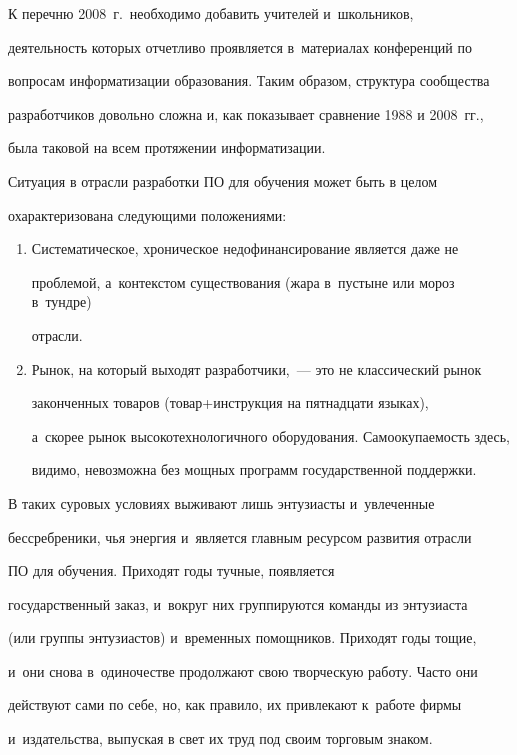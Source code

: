   К перечню 2008~г.\ необходимо добавить учителей и~школьников,

деятельность которых отчетливо проявляется в~материалах конференций по

вопросам информатизации образования. Таким образом, структура сообщества

разработчиков довольно сложна и, как показывает сравнение 1988 и 2008~гг.,

была таковой на всем протяжении информатизации.



  Ситуация в отрасли разработки ПО для обучения может быть в целом

охарактеризована следующими положениями:

  \begin{enumerate}[1.]

  \item  Систематическое, хроническое недофинансирование является даже не

проб\-ле\-мой, а~контекстом существования (жара в~пустыне или мороз в~тундре)

отрасли.

  \item  Рынок, на который выходят разработчики,~--- это не классический рынок

законченных товаров (то\-вар\;+\;ин\-струк\-ция на пятнадцати языках),

а~скорее рынок высокотехнологичного оборудования. Самоокупаемость здесь,

видимо, невозможна без мощных программ государственной поддержки.

  \end{enumerate}



  В таких суровых условиях выживают лишь энтузиасты и~увлеченные

бес\-среб\-реники, чья энергия и~является главным ресурсом развития отрасли

ПО для обучения. Приходят годы тучные, появляется

государственный заказ, и~вокруг них группируются команды из энтузиаста

(или группы энтузиастов) и~временных помощников. Приходят годы тощие,

и~они снова в~одиночестве продолжают свою творческую работу. Часто они

действуют сами по себе, но, как правило, их привлекают к~работе фирмы

и~издательства, выпуская в свет их труд под своим торговым знаком.



